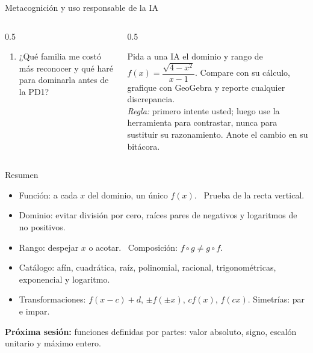 \documentclass[10pt,aspectratio=169]{beamer}
\begin{document}
\begin{frame}{Metacognición y uso responsable de la IA}
  \small
  \begin{columns}[t]
    \begin{column}{0.5\textwidth}
      \begin{metacog}
        \begin{enumerate}
          \metacomun
          \item ¿Qué familia me costó más reconocer y qué haré para dominarla antes de la PD1?
        \end{enumerate}
      \end{metacog}
    \end{column}
    \begin{column}{0.5\textwidth}
      \begin{iabox}
        Pida a una IA el dominio y rango de $f(x)=\dfrac{\sqrt{4-x^2}}{x-1}$. Compare con su cálculo, grafique con GeoGebra y reporte cualquier discrepancia.\\[2pt]
        \textit{Regla:} primero intente usted; luego use la herramienta para contrastar, nunca para sustituir su razonamiento. Anote el cambio en su bitácora.
      \end{iabox}
    \end{column}
  \end{columns}
\end{frame}

\begin{frame}{Resumen}
  \begin{itemize}
    \item Función: a cada $x$ del dominio, un único $f(x)$. \ Prueba de la recta vertical.
    \item Dominio: evitar división por cero, raíces pares de negativos y logaritmos de no positivos.
    \item Rango: despejar $x$ o acotar. \ Composición: $f\circ g\neq g\circ f$.
    \item Catálogo: afín, cuadrática, raíz, polinomial, racional, trigonométricas, exponencial y logaritmo.
    \item Transformaciones: $f(x-c)+d$, $\pm f(\pm x)$, $cf(x)$, $f(cx)$. Simetrías: par e impar.
  \end{itemize}
  \vspace{3mm}
  \textbf{Próxima sesión:} funciones definidas por partes: valor absoluto, signo, escalón unitario y máximo entero.
\end{frame}
\end{document}
